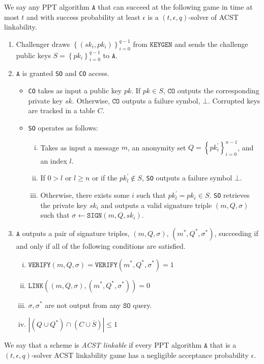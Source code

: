 \documentclass{llncs}
\begin{document}
\begin{definition}\label{def:acst-link-adv}
We say any PPT algorithm $\texttt{A}$ that can succeed at the following game in time at most $t$ and with success probability at least $\epsilon$ is a $(t, \epsilon, q)$-solver of ACST linkability.

\begin{enumerate}
\item Challenger draws $\left\{(sk_i, pk_i)\right\}_{i=0}^{q-1}$ from $\texttt{KEYGEN}$ and sends the challenge public keys $S = \left\{pk_i\right\}_{i=0}^{q-1}$ to $\texttt{A}$.

\item $\texttt{A}$ is granted \texttt{SO} and \texttt{CO} access.
    \begin{itemize}
    \item \texttt{CO} takes as input a public key $pk$. If $pk \in S$, $\texttt{CO}$ outputs the corresponding private key $sk$. Otherwise, $\texttt{CO}$ outputs a failure symbol, $\bot$. Corrupted keys are tracked in a table $C$.

    \item \texttt{SO} operates as follows:
        \begin{enumerate}[(i)]
        \item Takes as input a message $m$, an anonymity set $Q = \left\{pk^\prime_i\right\}_{i=0}^{n-1}$, and an index $l$.

        \item If $0 > l$ or $l \geq n$ or if the $pk^\prime_l \notin S$, \texttt{SO} outputs a failure symbol $\bot$.

        \item Otherwise, there exists some $i$ such that $pk^\prime_l = pk_i \in S$. \texttt{SO} retrieves the private key $sk_i$ and outputs a valid signature triple $(m, Q, \sigma)$ such that $\sigma \leftarrow \texttt{SIGN}(m, Q, sk_i)$.
        \end{enumerate}
    \end{itemize}

\item $\texttt{A}$ outputs a pair of signature triples, $(m, Q, \sigma)$, $(m^*, Q^*, \sigma^*)$, succeeding if and only if all of the following conditions are satisfied.
    \begin{enumerate}[(i)]
        \item $\texttt{VERIFY}(m, Q, \sigma) = \texttt{VERIFY}(m^*, Q^*, \sigma^*) = 1$
        \item $\texttt{LINK}((m, Q, \sigma), (m^*, Q^*, \sigma^*)) = 0$
        \item $\sigma, \sigma^*$ are not output from any $\texttt{SO}$ query.
        \item $\left|(Q \cup Q^* ) \cap (C \cup \overline{S})\right| \leq 1$
    \end{enumerate}
\end{enumerate}
We say that a scheme is \textit{ACST linkable} if every PPT algorithm $\texttt{A}$ that is a $(t, \epsilon, q)$-solver ACST linkability game has a negligible acceptance probability $\epsilon$.
\end{definition}
\end{document}
